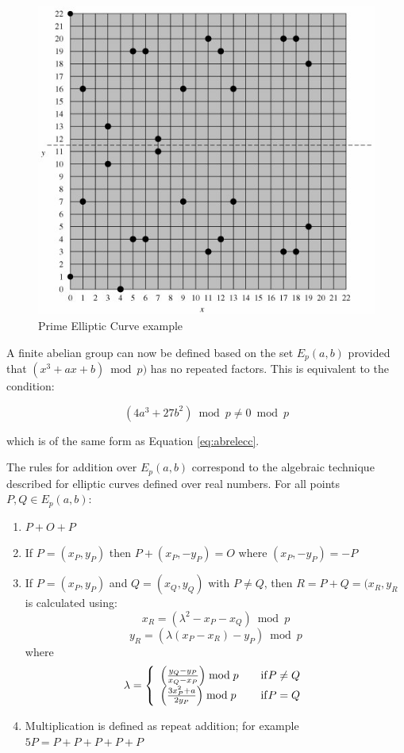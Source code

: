 \documentclass[a4paper,12pt]{report}
\begin{document}
\begin{figure}[htb]
\centering
\includegraphics[scale=0.7]{images/ecczpexample.jpg}
\caption{Prime Elliptic Curve example}
\label{fig:ecczpexample}
\end{figure}

A finite abelian group can now be defined based on the set $E_{p}(a,b)$ provided that $(x^3 + ax + b) \bmod p)$ has no repeated factors. This is equivalent to the condition:

\begin{equation}
 (4a^3 + 27b^2) \bmod p \neq 0 \bmod p
 \label{eq:ecczpcon}
\end{equation}

which is of the same form as Equation \ref{eq:abrelecc}.

The rules for addition over $E_{p}(a,b)$ correspond to the algebraic technique described for elliptic curves defined over real numbers. For all points $P, Q \in E_{p}(a,b)$:

\begin{enumerate}
 \item $P + O + P$
 \item If $P = (x_{P},y_{P})$ then $P + (x_{P},-y_{P}) = O$ where $(x_{P},-y_{P}) = -P$
 \item If $P = (x_{P},y_{P})$ and $Q = (x_{Q},y_{Q})$ with $P \neq Q$, then $R = P + Q = (x_{R},y_{R}$ is calculated using:
	\[x_{R} = (\lambda^2 - x_{P} - x_{Q}) \bmod p \]
        \[ y_{R} = (\lambda(x_{P} - x_{R}) - y_{P}) \bmod p\]
 where
 \[ \lambda = \left\{
  \begin{array}{l l}
    \left( \frac{y_{Q} - y_{P}}{x_{Q} - x_{P}} \right) \bmod p & \quad \mathrm{if} P \neq Q \\
    \left(\frac{3x^{2}_{P} + a}{2y_{P}}\right) \bmod p & \quad \mathrm{if} P = Q
  \end{array} \right.
\]

 \item Multiplication is defined as repeat addition; for example $5P = P + P + P + P + P$
\end{enumerate}
\end{document}
